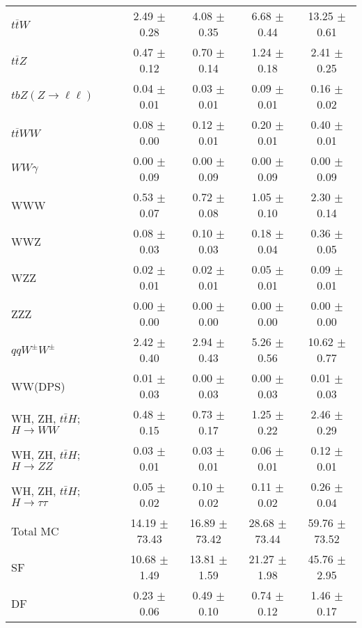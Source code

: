 \begin{tabular}{l|cccc}
                   $t\overline{t}W$ &  2.49 $\pm$  0.28 &  4.08 $\pm$  0.35 &  6.68 $\pm$  0.44 & 13.25 $\pm$  0.61 \\
                   $t\overline{t}Z$ &  0.47 $\pm$  0.12 &  0.70 $\pm$  0.14 &  1.24 $\pm$  0.18 &  2.41 $\pm$  0.25 \\
    $tbZ (Z \rightarrow \ell \ell)$ &  0.04 $\pm$  0.01 &  0.03 $\pm$  0.01 &  0.09 $\pm$  0.01 &  0.16 $\pm$  0.02 \\
                  $t\overline{t}WW$ &  0.08 $\pm$  0.00 &  0.12 $\pm$  0.01 &  0.20 $\pm$  0.01 &  0.40 $\pm$  0.01 \\
                         $WW\gamma$ &  0.00 $\pm$  0.09 &  0.00 $\pm$  0.09 &  0.00 $\pm$  0.09 &  0.00 $\pm$  0.09 \\
                                WWW &  0.53 $\pm$  0.07 &  0.72 $\pm$  0.08 &  1.05 $\pm$  0.10 &  2.30 $\pm$  0.14 \\
                                WWZ &  0.08 $\pm$  0.03 &  0.10 $\pm$  0.03 &  0.18 $\pm$  0.04 &  0.36 $\pm$  0.05 \\
                                WZZ &  0.02 $\pm$  0.01 &  0.02 $\pm$  0.01 &  0.05 $\pm$  0.01 &  0.09 $\pm$  0.01 \\
                                ZZZ &  0.00 $\pm$  0.00 &  0.00 $\pm$  0.00 &  0.00 $\pm$  0.00 &  0.00 $\pm$  0.00 \\
                 $qqW^{\pm}W^{\pm}$ &  2.42 $\pm$  0.40 &  2.94 $\pm$  0.43 &  5.26 $\pm$  0.56 & 10.62 $\pm$  0.77 \\
                            WW(DPS) &  0.01 $\pm$  0.03 &  0.00 $\pm$  0.03 &  0.00 $\pm$  0.03 &  0.01 $\pm$  0.03 \\
WH, ZH, $t\bar{t}H$; $H \rightarrow WW$ &  0.48 $\pm$  0.15 &  0.73 $\pm$  0.17 &  1.25 $\pm$  0.22 &  2.46 $\pm$  0.29 \\
WH, ZH, $t\bar{t}H$; $H \rightarrow ZZ$ &  0.03 $\pm$  0.01 &  0.03 $\pm$  0.01 &  0.06 $\pm$  0.01 &  0.12 $\pm$  0.01 \\
WH, ZH, $t\bar{t}H$; $H \rightarrow \tau\tau$ &  0.05 $\pm$  0.02 &  0.10 $\pm$  0.02 &  0.11 $\pm$  0.02 &  0.26 $\pm$  0.04 \\
\hline\hline
                           Total MC & 14.19 $\pm$ 73.43 & 16.89 $\pm$ 73.42 & 28.68 $\pm$ 73.44 & 59.76 $\pm$ 73.52 \\
\hline
                                 SF & 10.68 $\pm$  1.49 & 13.81 $\pm$  1.59 & 21.27 $\pm$  1.98 & 45.76 $\pm$  2.95 \\
                                 DF &  0.23 $\pm$  0.06 &  0.49 $\pm$  0.10 &  0.74 $\pm$  0.12 &  1.46 $\pm$  0.17 \\

\end{tabular}

